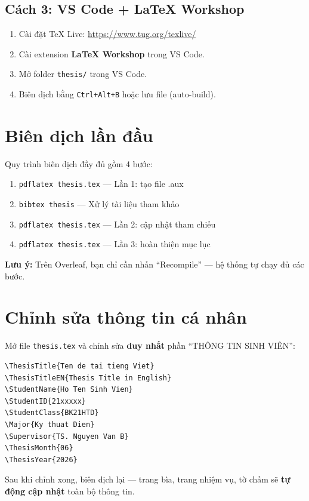 \subsection{Cách 3: VS Code + LaTeX Workshop}

\begin{enumerate}
  \item Cài đặt TeX Live: \url{https://www.tug.org/texlive/}
  \item Cài extension \textbf{LaTeX Workshop} trong VS Code.
  \item Mở folder \texttt{thesis/} trong VS Code.
  \item Biên dịch bằng \texttt{Ctrl+Alt+B} hoặc lưu file (auto-build).
\end{enumerate}

\section{Biên dịch lần đầu}
\label{sec:first-compile}

Quy trình biên dịch đầy đủ gồm 4 bước:

\begin{enumerate}
  \item \texttt{pdflatex thesis.tex} --- Lần 1: tạo file .aux
  \item \texttt{bibtex thesis} --- Xử lý tài liệu tham khảo
  \item \texttt{pdflatex thesis.tex} --- Lần 2: cập nhật tham chiếu
  \item \texttt{pdflatex thesis.tex} --- Lần 3: hoàn thiện mục lục
\end{enumerate}

\textbf{Lưu ý:} Trên Overleaf, bạn chỉ cần nhấn ``Recompile'' --- hệ thống tự chạy đủ các bước.

\section{Chỉnh sửa thông tin cá nhân}
\label{sec:personal-info}

Mở file \texttt{thesis.tex} và chỉnh sửa \textbf{duy nhất} phần ``THÔNG TIN SINH VIÊN'':

\begin{lstlisting}[style=latexstyle, caption={Các lệnh thông tin cá nhân trong thesis.tex}]
\ThesisTitle{Ten de tai tieng Viet}
\ThesisTitleEN{Thesis Title in English}
\StudentName{Ho Ten Sinh Vien}
\StudentID{21xxxxx}
\StudentClass{BK21HTD}
\Major{Ky thuat Dien}
\Supervisor{TS. Nguyen Van B}
\ThesisMonth{06}
\ThesisYear{2026}
\end{lstlisting}

Sau khi chỉnh xong, biên dịch lại --- trang bìa, trang nhiệm vụ, tờ chấm sẽ \textbf{tự động cập nhật} toàn bộ thông tin.

